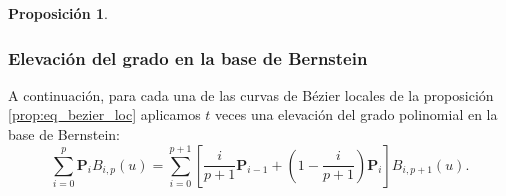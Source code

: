 \documentclass[11pt]{book}
\theoremstyle{plain} %
\newtheorem{proposicion}[teorema]{Proposición}
\theoremstyle{definition} %
\theoremstyle{definition} %
\begin{document}
\begin{proposicion}
\end{proposicion}

\subsubsection{Elevación del grado en la base de Bernstein}

A continuación, para cada una de las curvas de Bézier locales de la proposición \ref{prop:eq_bezier_loc} aplicamos $t$ veces
una elevación del grado polinomial en la base de Bernstein:
\begin{equation}\label{eq:bernstein_bases_elevation}
    \sum_{i=0}^p \mathbf{P}_i B_{i,p}(u) = \sum_{i=0}^{p+1} \left[ \frac{i}{p+1} \mathbf{P}_{i-1} + \left(1 - \frac{i}{p+1}\right) \mathbf{P}_i \right] B_{i, p+1}(u).
\end{equation}
\end{document}
